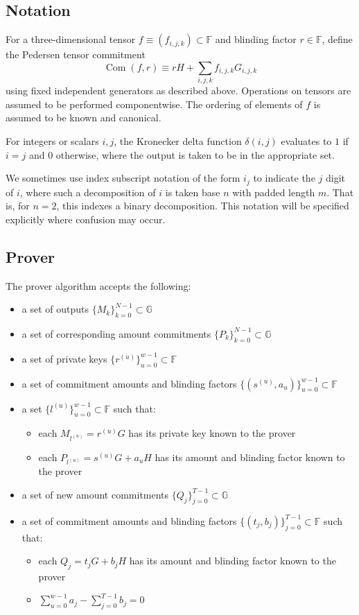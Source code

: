 \documentclass[draft]{article}
\newcommand{\G}{\mathbb{G}}
\newcommand{\F}{\mathbb{F}}
\newcommand{\com}{\operatorname{Com}}
\begin{document}
\subsection{Notation}
For a three-dimensional tensor $f \equiv (f_{i,j,k}) \subset \F$ and blinding factor $r \in \F$, define the Pedersen tensor commitment $$\com(f,r) \equiv rH + \sum_{i,j,k} f_{i,j,k} G_{i,j,k}$$ using fixed independent generators as described above.
Operations on tensors are assumed to be performed componentwise.
The ordering of elements of $f$ is assumed to be known and canonical.

For integers or scalars $i,j$, the Kronecker delta function $\delta(i,j)$ evaluates to $1$ if $i=j$ and $0$ otherwise, where the output is taken to be in the appropriate set.

We sometimes use index subscript notation of the form $i_j$ to indicate the $j$ digit of $i$, where such a decomposition of $i$ is taken base $n$ with padded length $m$.
That is, for $n=2$, this indexes a binary decomposition.
This notation will be specified explicitly where confusion may occur.


\subsection{Prover}
The prover algorithm accepts the following:
\begin{itemize}
\item a set of outputs $\{M_k\}_{k=0}^{N-1} \subset \G$
\item a set of corresponding amount commitments $\{P_k\}_{k=0}^{N-1} \subset \G$
\item a set of private keys $\{r^{(u)}\}_{u=0}^{w-1} \subset \F$
\item a set of commitment amounts and blinding factors $\{(s^{(u)},a_u)\}_{u=0}^{w-1} \subset \F$
\item a set $\{l^{(u)}\}_{u=0}^{w-1} \subset \F$ such that:
\begin{itemize}
\item each $M_{l^{(u)}} = r^{(u)}G$ has its private key known to the prover
\item each $P_{l^{(u)}} = s^{(u)}G + a_uH$ has its amount and blinding factor known to the prover
\end{itemize}
\item a set of new amount commitments $\{Q_j\}_{j=0}^{T-1} \subset \G$
\item a set of commitment amounts and blinding factors $\{(t_j,b_j)\}_{j=0}^{T-1} \subset \F$ such that:
\begin{itemize}
\item each $Q_j = t_jG + b_jH$ has its amount and blinding factor known to the prover
\item $\sum_{u=0}^{w-1} a_j - \sum_{j=0}^{T-1} b_j = 0$
\end{itemize}
\end{itemize}
\end{document}
